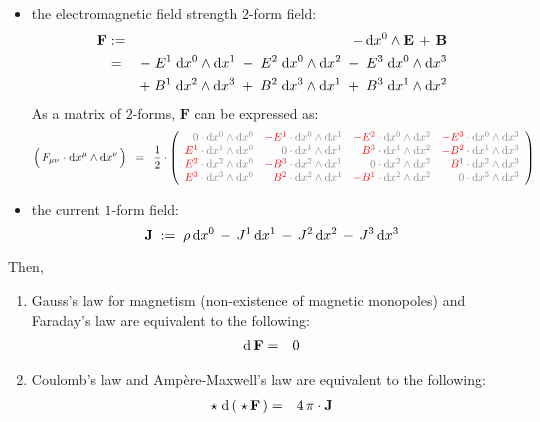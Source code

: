 \begin{theorem}
\begin{itemize}
\item
	the electromagnetic field strength $2$-form field:
	\begin{eqnarray*}
	\mathbf{F}
	& := &
		- \, \textnormal{d} x^{0} \wedge \mathbf{E} \, + \, \mathbf{B}
	\\
	& = &
		- \; E^{1}\;\textnormal{d} x^{0} \wedge \textnormal{d} x^{1} \; - \; E^{2}\;\textnormal{d} x^{0} \wedge \textnormal{d} x^{2} \; - \; E^{3}\;\textnormal{d} x^{0} \wedge \textnormal{d} x^{3}
	\\
	&&
		+\;
		B^{1}\;\textnormal{d} x^{2} \wedge \textnormal{d} x^{3}
		\;+\;
		B^{2}\;\textnormal{d} x^{3} \wedge \textnormal{d} x^{1}
		\;+\;
		B^{3}\;\textnormal{d} x^{1} \wedge \textnormal{d} x^{2}
	\end{eqnarray*}
	As a matrix of $2$-forms, $\mathbf{F}$ can be expressed as:
	\begin{equation*}
	\left(\,F_{\mu\nu}\overset{{\color{white}1}}{\cdot}\d x^{\mu} \wedge \d x^{\nu}\,\right)
	\;\; = \;\;
	\dfrac{1}{2}\cdot
	\left({\color{gray}\begin{array}{rrrr}
	0\cdot\d x^{0}\wedge\d x^{0} &
	{\color{red}-E^{1}} \cdot\d x^{0}\wedge\d x^{1} &
	{\color{red}-E^{2}} \cdot\d x^{0}\wedge\d x^{2} &
	{\color{red}-E^{3}} \cdot\d x^{0}\wedge\d x^{3}
	\\
	{\color{red}E^{1}} \cdot\d x^{1}\wedge\d x^{0} &
	0 \cdot\d x^{1}\wedge\d x^{1} &
	{\color{red}B^{3}} \cdot\d x^{1}\wedge\d x^{2} &
	{\color{red}-B^{2}} \cdot\d x^{1}\wedge\d x^{3}
	\\
	{\color{red}E^{2}} \cdot\d x^{2}\wedge\d x^{0} &
	{\color{red}-B^{3}} \cdot\d x^{2}\wedge\d x^{1} &
	0 \cdot\d x^{2}\wedge\d x^{2} &
	{\color{red}B^{1}} \cdot\d x^{2}\wedge\d x^{3}
	\\
	{\color{red}E^{3}} \cdot\d x^{3}\wedge\d x^{0} &
	{\color{red}B^{2}} \cdot\d x^{2}\wedge\d x^{1} &
	{\color{red}-B^{1}} \cdot\d x^{2}\wedge\d x^{2} &
	0 \cdot\d x^{3}\wedge\d x^{3}
	\end{array}}\right)
	\end{equation*}
\item
	the current $1$-form field:
	\begin{equation*}
	\mathbf{J} \; := \; \rho \, \textnormal{d} x^{0} \,-\, J^{1}\,\textnormal{d} x^{1} \,-\, J^{2}\,\textnormal{d} x^{2} \,-\, J^{3}\,\textnormal{d} x^{3}
	\end{equation*}
\end{itemize}
Then,
\begin{enumerate}
\item
	Gauss's law for magnetism (non-existence of magnetic monopoles) and Faraday's law are equivalent to the following:
	\begin{eqnarray*}
	\textnormal{d}\,\mathbf{F} & = & 0
	\end{eqnarray*}
\item
	Coulomb's law and Amp\`{e}re-Maxwell's law are equivalent to the following:
	\begin{eqnarray*}
	\star\;\textnormal{d} \left(\;\star\,\mathbf{F}\,\right) & = & 4\,\pi\cdot\mathbf{J}
	\end{eqnarray*}	
\end{enumerate}
\end{theorem}
\proof


